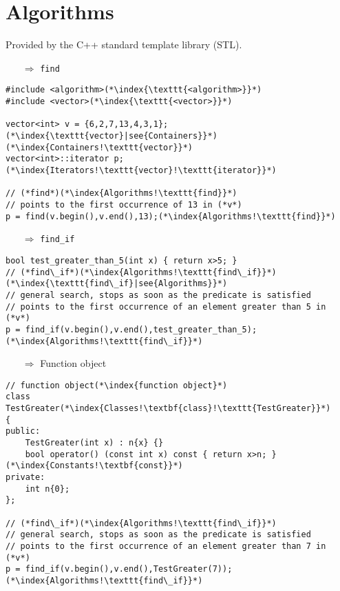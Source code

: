 \documentclass[10pt]{article}
\begin{document}
\section{Algorithms}
\small
Provided by the C++ standard template library (STL).
\begin{enumerate}
\item[$\Rightarrow$]  \texttt{find}
\end{enumerate}
\begin{lstlisting}
#include <algorithm>(*\index{\texttt{<algorithm>}}*)
#include <vector>(*\index{\texttt{<vector>}}*)

vector<int> v = {6,2,7,13,4,3,1};(*\index{\texttt{vector}|see{Containers}}*)(*\index{Containers!\texttt{vector}}*)
vector<int>::iterator p;(*\index{Iterators!\texttt{vector}!\texttt{iterator}}*)

// (*find*)(*\index{Algorithms!\texttt{find}}*)
// points to the first occurrence of 13 in (*v*)
p = find(v.begin(),v.end(),13);(*\index{Algorithms!\texttt{find}}*)
\end{lstlisting}
\begin{enumerate}
\item[$\Rightarrow$]  \texttt{find\_if}
\end{enumerate}
\begin{lstlisting}
bool test_greater_than_5(int x) { return x>5; }
// (*find\_if*)(*\index{Algorithms!\texttt{find\_if}}*)(*\index{\texttt{find\_if}|see{Algorithms}}*)
// general search, stops as soon as the predicate is satisfied
// points to the first occurrence of an element greater than 5 in (*v*)
p = find_if(v.begin(),v.end(),test_greater_than_5);(*\index{Algorithms!\texttt{find\_if}}*)
\end{lstlisting}
\begin{enumerate}
\item[$\Rightarrow$] Function object
\end{enumerate}
\begin{lstlisting}
// function object(*\index{function object}*)
class TestGreater(*\index{Classes!\textbf{class}!\texttt{TestGreater}}*)
{
public:
    TestGreater(int x) : n{x} {}
    bool operator() (const int x) const { return x>n; }(*\index{Constants!\textbf{const}}*)
private:
    int n{0};
};

// (*find\_if*)(*\index{Algorithms!\texttt{find\_if}}*)
// general search, stops as soon as the predicate is satisfied
// points to the first occurrence of an element greater than 7 in (*v*)
p = find_if(v.begin(),v.end(),TestGreater(7));(*\index{Algorithms!\texttt{find\_if}}*)
\end{lstlisting}
\end{document}

